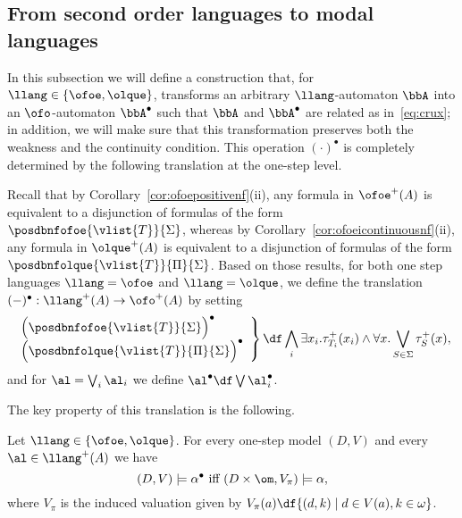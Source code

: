 \subsection{From second order languages to modal languages}
\label{ss:mso2mfl}

In this subsection we will define a construction that, for $\llang \in
\{{\ofoe},{\olque}\}$, transforms an arbitrary $\llang$-automaton $\bbA$ into
an $\ofo$-automaton $\bbA^{\bullet}$ such that $\bbA$ and $\bbA^{\bullet}$ 
are related as in~\eqref{eq:crux}; in addition, we will make sure that 
this transformation preserves both the weakness and the continuity condition.
This operation $(\cdot)^{\bullet}$ is completely determined by the following 
translation at the one-step level.

\begin{definition}
Recall that by Corollary~\ref{cor:ofoepositivenf}(ii), any formula in 
${\ofoe}^+(A)$ is equivalent to a disjunction of formulas of the form 
$\posdbnfofoe{\vlist{T}}{\Sigma}$, whereas
by Corollary~\ref{cor:ofoeicontinuousnf}(ii), any formula in ${\olque}^+(A)$ is 
equivalent to a disjunction of formulas of the form 
$\posdbnfolque{\vlist{T}}{\Pi}{\Sigma}$. 
Based on those results, for both one step languages $\llang={\ofoe}$ and 
$\llang={\olque}$, we define the translation 
$(-)^{\bullet} : {\llang}^+(A) \to \ofo^+(A)$ by setting
\[
\left.\begin{array}{l}
   \Big( \posdbnfofoe{\vlist{T}}{\Sigma} \Big)^{\bullet} 
\\ \Big( \posdbnfolque{\vlist{T}}{\Pi}{\Sigma} \Big)^{\bullet} 
\end{array}\right\}
\df \bigwedge_{i} \exists x_i. \tau^+_{T_i}(x_i) \land 
\forall x. \bigvee_{S\in\Sigma} \tau^+_S(x),
\]
and for $\al = \bigvee_{i} \al_{i}$ we define $\al^{\bullet} \df \bigvee 
\al_{i}^{\bullet}$.
\end{definition}

The key property of this translation is the following.

\begin{proposition}
\label{p-1P}
Let $\llang\in \{{\ofoe},{\olque}\}$.
For every one-step model $(D,V)$ and every $\al \in \llang^+(A)$ we have
\begin{equation}
\label{eq-1cr}
(D,V) \models \alpha^{\bullet} \text{ iff } (D\times \om,V_\pi) \models \alpha,
\end{equation}
where $V_{\pi}$ %
 is the induced valuation given by 
$V_{\pi}(a) \df \{ (d,k) \mid d \in V(a), k\in\omega\}$.
\end{proposition}

